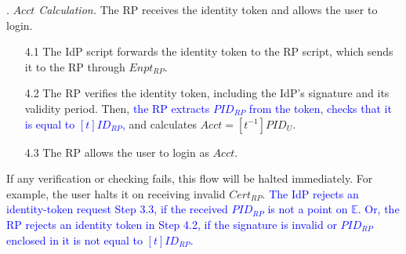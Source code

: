 . {\em $Acct$ Calculation.}
The RP receives the identity token and allows the user to login.
\vspace{-\topsep}
\begin{itemize}
\setlength{\topsep}{0pt}
\setlength{\partopsep}{0pt}
\setlength{\itemsep}{0pt}
\setlength{\parsep}{0pt}
\setlength{\parskip}{0pt}
\item [4.1]
The IdP script forwards the identity token to the RP script,
    which sends it to the RP through $Enpt_{RP}$.
\item[4.2] The RP verifies the identity token, including the IdP's signature and its validity period.
Then, \textcolor{blue}{the RP extracts $PID_{RP}$ from the token, checks that it is equal to $[t]ID_{RP}$,}
and calculates $Acct = [t^{-1}]{PID_U}$.

\item [4.3] The RP allows the user to login as $Acct$.

\end{itemize}


If any verification or checking fails,
     this flow will be halted immediately.
For example, the user halts it
    on receiving invalid $Cert_{RP}$.
\textcolor{blue}{The IdP rejects an identity-token request Step 3.3, if the received $PID_{RP}$ is not a point on $\mathbb{E}$.
Or, the RP rejects an identity token in Step 4.2,
    if the signature is invalid or $PID_{RP}$ enclosed in it is not equal to $[t]ID_{RP}$.}



